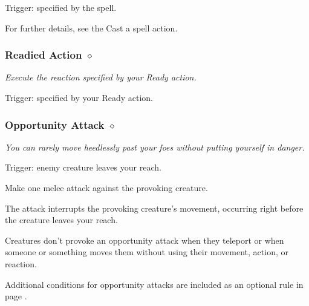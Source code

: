     Trigger: specified by the spell.

    For further details, see the Cast a spell action.
\subsubsection{Readied Action $\diamond$}
    \textit{Execute the reaction specified by your Ready action.}

    Trigger: specified by your Ready action.
\subsubsection{Opportunity Attack $\diamond$}
    \textit{You can rarely move heedlessly past your foes without putting yourself in danger.}

    Trigger: enemy creature leaves your reach.

    Make one melee attack against the provoking creature.

    The attack interrupts the provoking creature's movement, occurring right before the creature leaves your reach.

    Creatures don't provoke an opportunity attack when they teleport or when someone or something moves them without using their movement, action, or reaction.

    Additional conditions for opportunity attacks are included as an optional rule in page \pageref{rule::opportunityattacks}.
